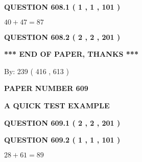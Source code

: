 \documentclass[12pt]{article}
\begin{document}
   
  
\vspace{0.2in}
  
{\textbf{\Large{QUESTION
608.1 
 ( 1 , 1 , 101 )
}}}
  
  
 
 

$ %
40 +  %
47=   %
87$
 
 
  
\vspace{0.2in}
  
{\textbf{\Large{QUESTION
608.2 
 ( 2 , 2 , 201 )
}}}
  
  
   
   
 \vspace{0.2in}
 
   
   
   
   
\vspace{1.0in} 
{\textbf{\large{ *** END OF PAPER, THANKS *** }}} 
   
   
\hspace{1.0in} By: 
 239 ( 416 ,  613 )
   
   
   
   
\newpage 
\setcounter{page}{ 
   609001 } 
   
   
   
   
 {\textbf{ \Large{ PAPER NUMBER  609  }}}
   
   
\vspace{0.2in}
   
   
   
   
   
   
 \vspace{0.2in}
{\LARGE {\textbf{ A QUICK TEST EXAMPLE}}}
   
   
  
\vspace{0.2in}
  
{\textbf{\Large{QUESTION
609.1 
 ( 2 , 2 , 201 )
}}}
  
  
  
\vspace{0.2in}
  
{\textbf{\Large{QUESTION
609.2 
 ( 1 , 1 , 101 )
}}}
  
  
 
 

$ %
28 +  %
61=   %
89$
 
 
   
\end{document}
